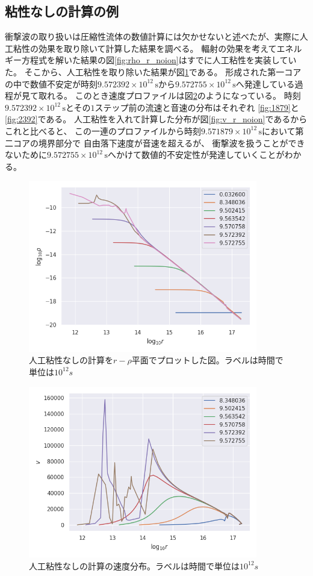 \documentclass[a4j, dvipdfmx]{jsarticle}
\begin{document}
\subsection{粘性なしの計算の例}
衝撃波の取り扱いは圧縮性流体の数値計算には欠かせないと述べたが、実際に人工粘性の効果を取り除いて計算した結果を調べる。
輻射の効果を考えてエネルギー方程式を解いた結果の図\ref{fig:rho_r_noion}はすでに人工粘性を実装していた。
そこから、人工粘性を取り除いた結果が図\ref{fig:noQ}である。
形成された第一コアの中で数値不安定が時刻$9.572392\times10^{12}\,\mathrm{s}$から$9.572755\times10^{12}\,\mathrm{s}$へ発達している過程が見て取れる。
このとき速度プロファイルは図\ref{fig:v_r_noQ}のようになっている。
時刻$9.572392\times10^{12}\,\mathrm{s}$とその$1$ステップ前の流速と音速の分布はそれぞれ
\ref{fig:1879}と\ref{fig:2392}である。
人工粘性を入れて計算した分布が図\ref{fig:v_r_noion}であるからこれと比べると、
この一連のプロファイルから時刻$9.571879\times10^{12}\,\mathrm{s}$において第二コアの境界部分で
自由落下速度が音速を超えるが、
衝撃波を扱うことができないために$9.572755\times10^{12}\,\mathrm{s}$へかけて数値的不安定性が発達していくことがわかる。
\begin{figure}[H]
    \includegraphics[clip,width=10.0cm]{graph/noQ.png}
    \caption{人工粘性なしの計算を$r-\rho$平面でプロットした図。ラベルは時間で単位は$10^{12}s$}
    \label{fig:noQ}
\end{figure}
\begin{figure}[H]
    \includegraphics[clip,width=10.0cm]{graph/v_r_noQ.png}
    \caption{人工粘性なしの計算の速度分布。ラベルは時間で単位は$10^{12}s$}
    \label{fig:v_r_noQ}
\end{figure}
\end{document}
